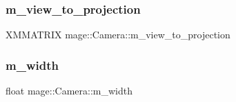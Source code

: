 \hypertarget{classmage_1_1_camera_a37b814e26a4c733a40a5f6fea691e958}{}\label{classmage_1_1_camera_a37b814e26a4c733a40a5f6fea691e958} 
\subsubsection{\texorpdfstring{m\+\_\+view\+\_\+to\+\_\+projection}{m\_view\_to\_projection}}
{\footnotesize\ttfamily X\+M\+M\+A\+T\+R\+IX mage\+::\+Camera\+::m\+\_\+view\+\_\+to\+\_\+projection\hspace{0.3cm}{\ttfamily [protected]}}

\hypertarget{classmage_1_1_camera_acc8f371214af02fdac9a1ff04508c4ca}{}\label{classmage_1_1_camera_acc8f371214af02fdac9a1ff04508c4ca} 
\subsubsection{\texorpdfstring{m\+\_\+width}{m\_width}}
{\footnotesize\ttfamily float mage\+::\+Camera\+::m\+\_\+width\hspace{0.3cm}{\ttfamily [protected]}}


